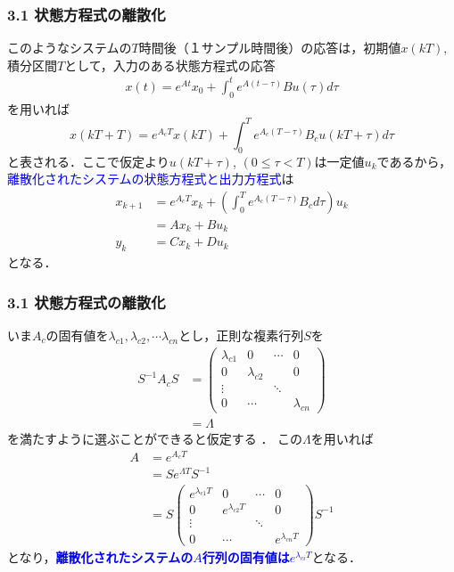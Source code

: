 \documentclass[10pt]{beamer}
\begin{document}
\begin{frame}[t]
\frametitle{3.1 状態方程式の離散化}
このようなシステムの$T$時間後（１サンプル時間後）の応答は，初期値$x(kT)$,積分区間$T$として，入力のある状態方程式の応答
\begin{align}
  x(t) = e^{At} x_0 + \int_0^t e^{A(t-\tau)} B u (\tau) d \tau
  
\end{align}
を用いれば
\begin{equation}
 x(kT+T) = e^{A_c T} x(kT) 
  + \int_0^T e^{A_c(T - \tau)}B_c u (kT + \tau) d \tau
\end{equation}
と表される．ここで仮定より$u(kT+\tau)$, $(0\leq\tau<T)$は一定値$u_k$であるから，
\textcolor{blue}{離散化されたシステムの状態方程式と出力方程式}は
\begin{align}
 x_{k+1} &= e^{A_cT} x_k 
  + \left( \int_0^T e^{A_c(T-\tau)} B_c d \tau \right) u_k \nonumber \\
 &= A x_k + B u_k \\
 y_k &= C x_k + D u_k 
\end{align}
となる．
\end{frame}

\begin{frame}[t]
\frametitle{3.1 状態方程式の離散化}
いま$A_c$の固有値を$\lambda_{c1}, \lambda_{c2},
\cdots \lambda_{cn}$とし，正則な複素行列$S$を
\begin{align}
 S^{-1} A_c S 
  &=
  \left(\begin{array}{cccc}
         \lambda_{c1} & 0            & \cdots & 0 \\
	 0            & \lambda_{c2} &        & 0 \\
	 \vdots       &              & \ddots & \\
	 0            & \cdots       &        & \lambda_{cn} 
	\end{array}\right) \nonumber \\
 &= \Lambda
\end{align}
を満たすように選ぶことができると仮定する%
．
この$\Lambda$を用いれば
\begin{align}
 A &=  e^{A_cT} \nonumber \\
 &= S e^{\Lambda T} S^{-1} \nonumber \\
 &=
  S \left(\begin{array}{cccc}
           e^{\lambda_{c1} T} & 0                  & \cdots & 0 \\
	   0                  & e^{\lambda_{c2} T} &        & 0 \\
	   \vdots             &                    & \ddots & \\
	   0                  & \cdots             & & e^{\lambda_{cn} T}
	  \end{array}\right)
  S^{-1}
\end{align}
となり，\textcolor{blue}{\bf 離散化されたシステムの$A$行列の固有値は$e^{\lambda_{ci} T}$}となる．
\end{frame}
\end{document}
